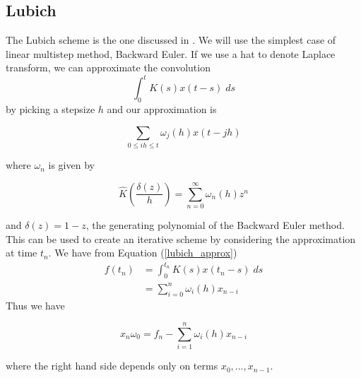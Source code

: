 \documentclass[11pt]{article}
\numberwithin{equation}{section}
\theoremstyle{definition}
\newcommand{\eqn}[2]{
  \begin{equation}
    \label{#1}
    #2
  \end{equation}
}
\newcommand{\eqr}[1]{Equation (\ref{#1})}
\begin{document}
\subsection{Lubich}
The Lubich scheme is the one discussed in \cite{lubich}. We will use the simplest
case of linear multistep method, Backward Euler. If we use a hat to denote Laplace
transform, we can approximate the convolution
$$
  \int_0^t K(s) x(t - s)\; ds
$$
by picking a stepsize $h$ and our approximation is
\eqn{lubich_approx}{
  \sum_{0 \leq ih \leq t} \omega_j(h) x(t - jh)
}
where $\omega_n$ is given by
\eqn{lubich_omega}{
  \hat{K}\left(\frac{\delta(z)}{h}\right) = \sum_{n=0}^\infty \omega_n(h) z^n
}
and $\delta(z) = 1-z$, the generating polynomial of the Backward Euler method.
This can be used to create an iterative scheme by considering the approximation
at time $t_n$. We have from \eqr{lubich_approx}
\begin{align}
\nonumber  f(t_n)
                  &= \int_0^{t_n} K(s) x(t_n - s)\; ds \\
                  &= \sum_{i=0}^{n} \omega_i(h) x_{n-i}
\end{align}
Thus we have
\eqn{lubich_scheme}{
  x_n \omega_0 = f_n - \sum_{i=1}^n \omega_i(h) x_{n-i}
}
where the right hand side depends only on terms $x_0, ..., x_{n-1}$.
\end{document}
